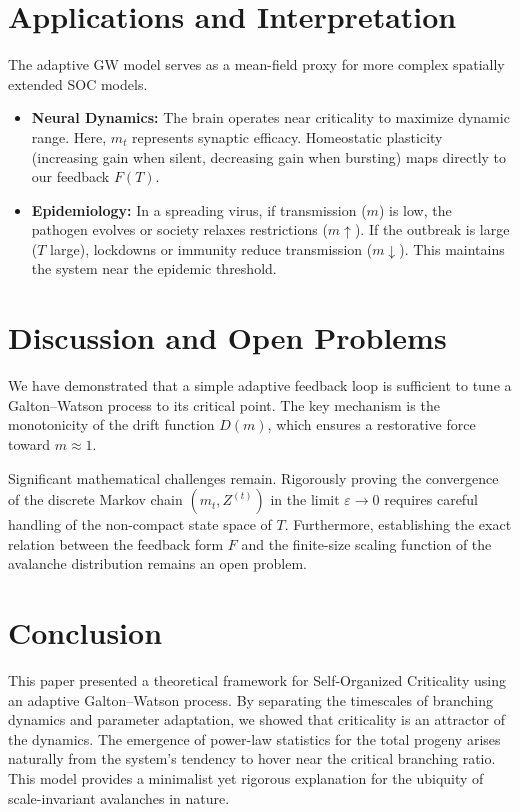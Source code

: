 \documentclass[11pt, a4paper]{article}
\theoremstyle{definition}
\begin{document}
\section{Applications and Interpretation}

The adaptive GW model serves as a mean-field proxy for more complex spatially extended SOC models.

\begin{itemize}
    \item \textbf{Neural Dynamics:} The brain operates near criticality to maximize dynamic range. Here, $m_t$ represents synaptic efficacy. Homeostatic plasticity (increasing gain when silent, decreasing gain when bursting) maps directly to our feedback $F(T)$.
    \item \textbf{Epidemiology:} In a spreading virus, if transmission ($m$) is low, the pathogen evolves or society relaxes restrictions ($m \uparrow$). If the outbreak is large ($T$ large), lockdowns or immunity reduce transmission ($m \downarrow$). This maintains the system near the epidemic threshold.
\end{itemize}

\section{Discussion and Open Problems}

We have demonstrated that a simple adaptive feedback loop is sufficient to tune a Galton--Watson process to its critical point. The key mechanism is the monotonicity of the drift function $D(m)$, which ensures a restorative force toward $m \approx 1$.

Significant mathematical challenges remain. Rigorously proving the convergence of the discrete Markov chain $(m_t, Z^{(t)})$ in the limit $\varepsilon \to 0$ requires careful handling of the non-compact state space of $T$. Furthermore, establishing the exact relation between the feedback form $F$ and the finite-size scaling function of the avalanche distribution remains an open problem.

\section{Conclusion}

This paper presented a theoretical framework for Self-Organized Criticality using an adaptive Galton--Watson process. By separating the timescales of branching dynamics and parameter adaptation, we showed that criticality is an attractor of the dynamics. The emergence of power-law statistics for the total progeny arises naturally from the system's tendency to hover near the critical branching ratio. This model provides a minimalist yet rigorous explanation for the ubiquity of scale-invariant avalanches in nature.
\end{document}

